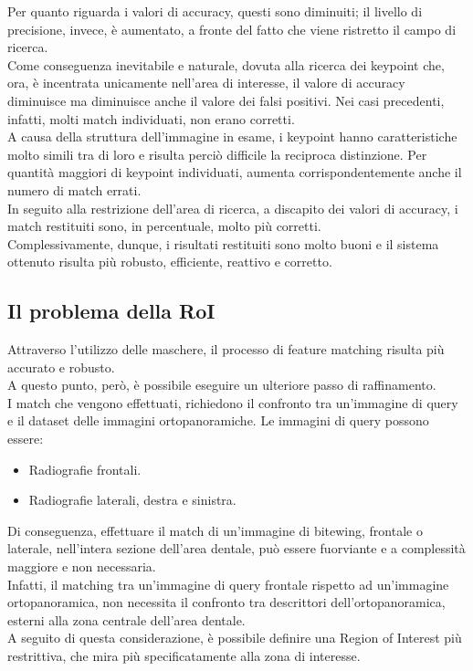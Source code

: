 \documentclass[12pt,a4paper,openright,twoside]{book}
\begin{document}
Per quanto riguarda i valori di accuracy, questi sono diminuiti; il livello di precisione, invece, è aumentato, a fronte del fatto che viene ristretto il campo di ricerca.\\
Come conseguenza inevitabile e naturale, dovuta alla ricerca dei keypoint che, ora, è incentrata unicamente nell'area di interesse, il valore di accuracy diminuisce ma diminuisce anche il valore dei falsi positivi. Nei casi precedenti, infatti, molti match individuati, non erano corretti.\\
A causa della struttura dell'immagine in esame, i keypoint hanno caratteristiche molto simili tra di loro e risulta perciò difficile la reciproca distinzione. Per quantità maggiori di keypoint individuati, aumenta corrispondentemente anche il numero di match errati. \\
In seguito alla restrizione dell'area di ricerca, a discapito dei valori di accuracy, i match restituiti sono, in percentuale, molto più corretti. \\
Complessivamente, dunque, i risultati restituiti sono molto buoni e il sistema ottenuto risulta più robusto, efficiente, reattivo e corretto.

\subsection{Il problema della RoI}
Attraverso l'utilizzo delle maschere, il processo di feature matching risulta più accurato e robusto.\\
A questo punto, però, è possibile eseguire un ulteriore passo di raffinamento.\\

I match che vengono effettuati, richiedono il confronto tra un'immagine di query e il dataset delle immagini ortopanoramiche. Le immagini di query possono essere:
\begin{itemize}
\item Radiografie frontali.
\item Radiografie laterali, destra e sinistra.
\end{itemize}

Di conseguenza, effettuare il match di un'immagine di bitewing, frontale o laterale, nell'intera sezione dell'area dentale, può essere fuorviante e a complessità maggiore e non necessaria.\\
Infatti, il matching tra un'immagine di query frontale rispetto ad un'immagine ortopanoramica, non necessita il confronto tra descrittori dell'ortopanoramica, esterni alla zona centrale dell'area dentale.\\
A seguito di questa considerazione, è possibile definire una Region of Interest più restrittiva, che mira più specificatamente alla zona di interesse. 
\end{document}
